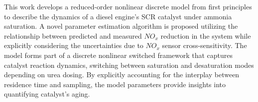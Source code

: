 This work develops a reduced-order nonlinear discrete model from first principles to describe the dynamics of a diesel
engine's SCR catalyst under ammonia saturation. A novel parameter estimation algorithm is proposed utilizing the
relationship between predicted and measured $NO_x$ reduction in the system while explicitly considering the
uncertainties due to $NO_x$ sensor cross-sensitivity. The model forms part of a discrete nonlinear switched framework
that captures catalyst reaction dynamics, switching between saturation and desaturation modes depending on urea dosing.
By explicitly accounting for the interplay between residence time and sampling, the model parameters provide insights
into quantifying catalyst's aging.
